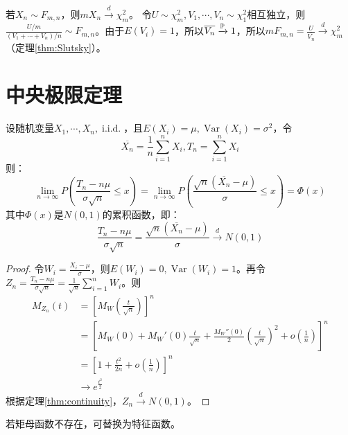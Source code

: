 \begin{example}
    若$X_n \sim F_{m,n}$，则$mX_n \xrightarrow{d} \chi^2_m$。
    令$U \sim \chi^2_m,V_1,\cdots ,V_n \sim \chi^2_1$相互独立，则$\frac{U/m}{(V_1+\cdots+V_n)/n} \sim F_{m,n}$。由于$E(V_i)=1$，所以$\overline{V_n} \xrightarrow{\P} 1$，所以$mF_{m,n}=\frac{U}{\overline{V_n}} \xrightarrow{d} \chi^2_m$（定理\ref{thm:Slutsky}）。
\end{example}

\section{中央极限定理}

\begin{theorem}[中央极限定理]\label{thm:central_limit}
    设随机变量$X_1,\cdots ,X_n,\operatorname{i.i.d.}$，且$E(X_i)=\mu,\operatorname{Var}(X_i)=\sigma^2$，令
    \[ \overline{X_n} = \frac{1}{n}\sum_{i=1}^n X_i, T_n=\sum_{i=1}^n X_i\]
    则：
    \[ \lim_{n \to \infty}P(\frac{T_n-n \mu}{\sigma\sqrt{n}}\le x)=\lim_{n \to \infty}P(\frac{\sqrt{n}(\overline{X_n}-\mu)}{\sigma}\le x) =\Phi(x)\]
    其中$\Phi(x)$是$N(0,1)$的累积函数，即：
    \[ \frac{T_n-n \mu}{\sigma\sqrt{n}}=\frac{\sqrt{n}(\overline{X_n}-\mu)}{\sigma} \xrightarrow{d} N(0,1)\]
\end{theorem}

\begin{proof}
    令$W_i=\frac{X_i-\mu}{\sigma}$，则$E(W_i)=0,\operatorname{Var}(W_i)=1$。再令$Z_n=\frac{T_n-n \mu}{\sigma\sqrt{n}}=\frac{1}{\sqrt{n}}\sum_{i=1}^n W_i$。则
    \begin{align*}
        M_{Z_n}(t) & = \left[ M_{W}(\frac{t}{\sqrt{n}}) \right]^n                                                                       \\
                   & = \left[ M_{W}(0)+M_{W}'(0)\frac{t}{\sqrt{n}}+\frac{M_{W}''(0)}{2}(\frac{t}{\sqrt{n}})^2 +o(\frac{1}{n}) \right]^n \\
                   & = \left[ 1 + \frac{t^2}{2n}+ o(\frac{1}{n}) \right]^n                                                              \\
                   & \to e^{\frac{t^2}{2}}
    \end{align*}
    根据定理\ref{thm:continuity}，$Z_n \xrightarrow{d} N(0,1)$。
\end{proof}
\begin{remark}
    若矩母函数不存在，可替换为特征函数。
\end{remark}

